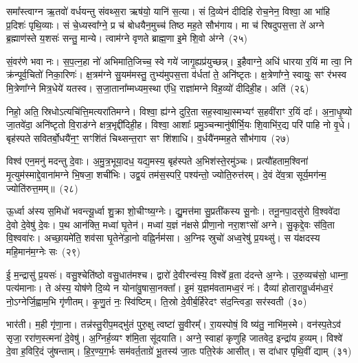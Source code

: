 समा᳚स्त्वाग्न ऋ॒तवो॑ वर्धयन्तु संवथ्स॒रा ऋष॑यो॒ यानि॑ स॒त्या। सं दि॒व्येन॑ दीदिहि रोच॒नेन॒ विश्वा॒ आ भा॑हि प्र॒दिशः॑ पृथि॒व्याः। सं चे॒ध्यस्वा᳚ग्ने॒ प्र च॑ बोधयैन॒मुच्च॑ तिष्ठ मह॒ते सौभ॑गाय। मा च॑ रिषदुपस॒त्ता ते॑ अग्ने ब्र॒ह्माण॑स्ते य॒शसः॑ सन्तु॒ मान्ये। त्वाम॑ग्ने वृणते ब्राह्म॒णा इ॒मे शि॒वो अ॑ग्ने~(२५)

सं॒वर॑णे भवा नः। स॒प॒त्न॒हा नो॑ अभिमाति॒जिच्च॒ स्वे गये॑ जागृ॒ह्यप्र॑युच्छन्न्। इ॒हैवाग्ने॒ अधि॑ धारया र॒यिं मा त्वा॒ नि क्र॑न्पूर्व॒चितो॑ निका॒रिणः॑। क्ष॒त्रम॑ग्ने सु॒यम॑मस्तु॒ तुभ्य॑मुपस॒त्ता व॑र्धतां ते॒ अनि॑ष्टृतः। क्ष॒त्रेणा᳚ग्ने॒ स्वायुः॒ सꣳ र॑भस्व मि॒त्रेणा᳚ग्ने मित्र॒धेये॑ यतस्व। स॒जा॒ताना᳚म्मध्यम॒स्था ए॑धि॒ राज्ञा॑मग्ने विह॒व्यो॑ दीदिही॒ह। अति॑~(२६)

निहो॒ अति॒ स्रिधो\-ऽत्यचि॑त्ति॒मत्यरा॑तिमग्ने। विश्वा॒ ह्य॑ग्ने दुरि॒ता सह॒स्वाथा॒स्मभ्यꣳ॑ स॒हवी॑राꣳ र॒यिं दाः᳚। अ॒ना॒धृ॒ष्यो जा॒तवे॑दा॒ अनि॑ष्टृतो वि॒राड॑ग्ने क्षत्र॒भृद्दी॑दिही॒ह। विश्वा॒ आशाः᳚ प्रमु॒ञ्चन्मानु॑षीर्भि॒यः शि॒वाभि॑र॒द्य परि॑ पाहि नो वृ॒धे। बृह॑स्पते सवितर्बो॒धयै॑न॒ꣳ॒ सꣳशि॑तं चिथ्सन्त॒राꣳ सꣳ शि॑शाधि। व॒र्धयै॑नम्मह॒ते सौभ॑गाय~(२७)

विश्व॑ एन॒मनु॑ मदन्तु दे॒वाः। अ॒मु॒त्र॒भूया॒दध॒ यद्य॒मस्य॒ बृह॑स्पते अ॒भिश॑स्ते॒रमु॑ञ्चः। प्रत्यौ॑हताम॒श्विना॑ मृ॒त्युम॑स्माद्दे॒वाना॑मग्ने भि॒षजा॒ शची॑भिः। उद्व॒यं तम॑स॒स्परि॒ पश्य॑न्तो॒ ज्योति॒रुत्त॑रम्। दे॒वं दे॑व॒त्रा सूर्य॒मग॑न्म॒ ज्योति॑रुत्त॒मम्॥~(२८)

{\anuvakamend[{इ॒मे शि॒वो अ॒ग्ने\-ऽति॒ सौभ॑गाय॒ चतु॑स्त्रिꣳशच्च}]}%

ऊ॒र्ध्वा अ॑स्य स॒मिधो॑ भवन्त्यू॒र्ध्वा शु॒क्रा शो॒चीꣳष्य॒ग्नेः। द्यु॒मत्त॑मा सु॒प्रती॑कस्य सू॒नोः। तनू॒नपा॒दसु॑रो वि॒श्ववे॑दा दे॒वो दे॒वेषु॑ दे॒वः। प॒थ आन॑क्ति॒ मध्वा॑ घृ॒तेन॑। मध्वा॑ य॒ज्ञं न॑क्षसे प्रीणा॒नो नरा॒शꣳसो॑ अग्ने। सु॒कृद्दे॒वः स॑वि॒ता वि॒श्ववा॑रः। अच्छा॒यमे॑ति॒ शव॑सा घृ॒तेने॑डा॒नो वह्नि॒र्नम॑सा। अ॒ग्निꣴ स्रुचो॑ अध्व॒रेषु॑ प्र॒यथ्सु॑। स य॑क्षदस्य महि॒मान॑म॒ग्नेः सः~(२९)

ई॒ म॒न्द्रासु॑ प्र॒यसः॑। वसु॒श्चेति॑ष्ठो वसु॒धात॑मश्च। द्वारो॑ दे॒वीरन्व॑स्य॒ विश्वे᳚ व्र॒ता द॑दन्ते अ॒ग्नेः। उ॒रु॒व्यच॑सो॒ धाम्ना॒ पत्य॑मानाः। ते अ॑स्य॒ योष॑णे दि॒व्ये न योना॑वु॒षासा॒नक्ता᳚। इ॒मं य॒ज्ञम॑वतामध्व॒रं नः॑। दैव्या॑ होतारावू॒र्ध्वम॑ध्व॒रं नो॒\-ऽग्नेर्जि॒ह्वाम॒भि गृ॑णीतम्। कृ॒णु॒तं नः॒ स्वि॑ष्टिम्। ति॒स्रो दे॒वीर्ब॒र्हिरेदꣳ स॑द॒न्त्विडा॒ सर॑स्वती~(३०)

भार॑ती। म॒ही गृ॑णा॒ना। तन्न॑स्तु॒रीप॒मद्भु॑तं पुरु॒क्षु त्वष्टा॑ सु॒वीरम्᳚। रा॒यस्पोषं॒ वि ष्य॑तु॒ नाभि॑म॒स्मे। वन॑स्प॒ते\-ऽव॑ सृजा॒ ररा॑ण॒स्त्मना॑ दे॒वेषु॑। अ॒ग्निर्\mbox{}ह॒व्यꣳ श॑मि॒ता सू॑दयाति। अग्ने॒ स्वाहा॑ कृणुहि जातवेद॒ इन्द्रा॑य ह॒व्यम्। विश्वे॑ दे॒वा ह॒विरि॒दं जु॑षन्ताम्। हि॒र॒ण्य॒ग॒र्भः सम॑वर्त॒ताग्रे॑ भू॒तस्य॑ जा॒तः पति॒रेक॑ आसीत्। स दा॑धार पृथि॒वीं द्याम्~(३१)

